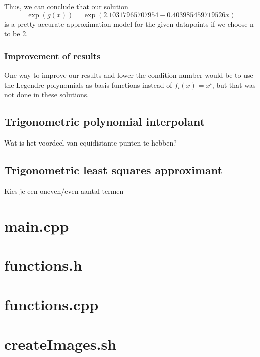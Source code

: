\documentclass[11pt, a4paper, titlepage, openright]{article}
\begin{document}
    Thus, we can conclude that our solution \[ \exp(g(x)) = \exp(2.10317965707954 - 0.403985459719526x) \]
    is a pretty accurate approximation model for the given datapoints if we choose n to be 2.


\subsubsection{Improvement of results}
One way to improve our results and lower the condition number would be to use the Legendre polynomials as basis functions instead
of \( f_i(x) = x^i  \), but that was not done in these solutions.
\subsection{Trigonometric polynomial interpolant}
Wat is het voordeel van equidistante punten te hebben?
\subsection{Trigonometric least squares approximant}
Kies je een oneven/even aantal termen

\onecolumn
\appendix
\appendixpage
\addappheadtotoc

\section{main.cpp}
    
    \newpage

\section{functions.h}
    

\bigskip
\section{functions.cpp}
    

\section{createImages.sh}
    
\end{document}
